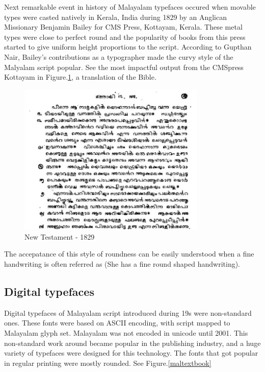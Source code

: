 \documentclass[10pt]{article}
\begin{document}
Next remarkable event in history of Malayalam typefaces occured when movable types were casted natively in Kerala, India during 1829 by an Anglican Missionary Benjamin Bailey\cite{babucherian} for CMS Press, Kottayam, Kerala. These metal types were close to perfect round and the popularity of books from this press started to give uniform height proportions to the script. According to Gupthan Nair, Bailey's contributions as a typographer made the curvy style of the Malyalam script popular\cite{gupthannair}. See the most impactful output from the CMSpress Kottayam in Figure.\ref{newtestament}, a translation of the Bible.


\begin{figure}
	\centering
	\includegraphics[width=0.8\textwidth]{images/newtestament1829.png}
	\caption{New Testament - 1829}
	\label{newtestament}
\end{figure}

The accepatance of this style of roundness can be easily understood when a fine handwriting is often referred as { } (She has a fine round shaped handwriting).


\subsection{Digital typefaces}

Digital typefaces of  Malayalam script introduced during 19s were non-standard ones. These fonts were based on ASCII encoding, with script mapped to Malayalam glyph set. Malayalam was not encoded in unicode until 2001. This non-standard work around became popular in the publishing industry, and a huge variety of typefaces were designed for this technology. The fonts that got popular in regular printing were mostly rounded. See Figure.\ref{maltextbook}
\end{document}
